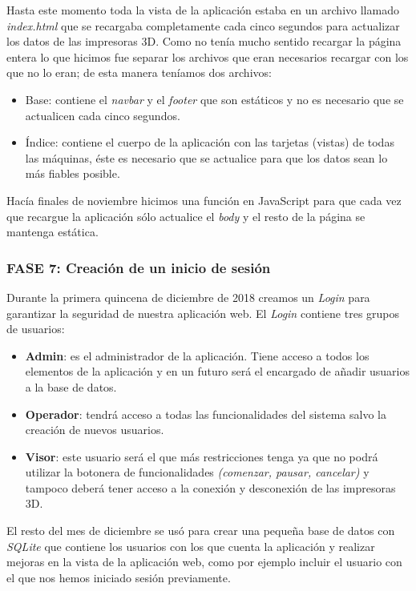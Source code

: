 Hasta este momento toda la vista de la aplicación estaba en un archivo llamado \textit{index.html} que se recargaba completamente cada cinco segundos para actualizar los datos de las impresoras 3D. Como no tenía mucho sentido recargar la página entera lo que hicimos fue separar los archivos que eran necesarios recargar con los que no lo eran; de esta manera teníamos dos archivos:
\begin{itemize}
\item Base: contiene el \textit{navbar} y el \textit{footer} que son estáticos y no es necesario que se actualicen cada cinco segundos.
\item Índice: contiene el cuerpo de la aplicación con las tarjetas (vistas) de todas las máquinas, éste es necesario que se actualice para que los datos sean lo más fiables posible.  
\end{itemize}

Hacía finales de noviembre hicimos una función en JavaScript para que cada vez que recargue la aplicación sólo actualice el \textit{body} y el resto de la página se mantenga estática.

\subsubsection{FASE 7: Creación de un inicio de sesión}
Durante la primera quincena de diciembre de 2018 creamos un \textit{Login} para garantizar la seguridad de nuestra aplicación web. El \textit{Login} contiene tres grupos de usuarios:

\begin{itemize}
\item \textbf{Admin}: es el administrador de la aplicación. Tiene acceso a todos los elementos de la aplicación y en un futuro será el encargado de añadir usuarios a la base de datos.
\item \textbf{Operador}: tendrá acceso a todas las funcionalidades del sistema salvo la creación de nuevos usuarios.
\item \textbf{Visor}: este usuario será el que más restricciones tenga ya que no podrá utilizar la botonera de funcionalidades \textit{(comenzar, pausar, cancelar)}  y tampoco deberá tener acceso a la conexión y desconexión de las impresoras 3D.
\end{itemize}

El resto del mes de diciembre se usó para crear una pequeña base de datos con \textit{SQLite} que contiene los usuarios con los que cuenta la aplicación y  realizar mejoras en la vista de la aplicación web, como por ejemplo incluir el usuario con el que nos hemos iniciado sesión previamente.


